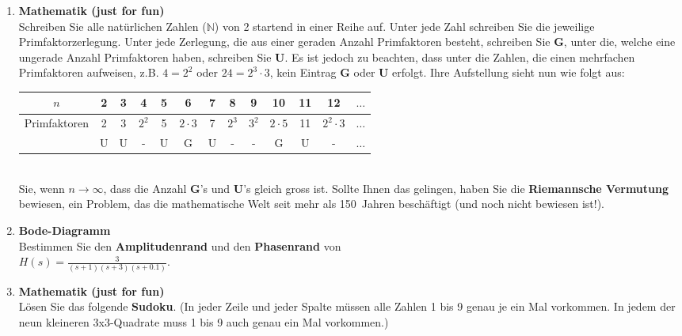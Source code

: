 {\begin{enumerate}
\item {\bf Mathematik (just for fun)}\\ Schreiben Sie alle nat\"urlichen Zahlen ($\mathbb{N}$) von 2 startend in einer Reihe auf. Unter jede Zahl schreiben Sie die jeweilige Primfaktorzerlegung. Unter jede Zerlegung, die aus einer geraden Anzahl Primfaktoren besteht, schreiben Sie {\bf G}, unter die, welche eine ungerade Anzahl Primfaktoren haben, schreiben Sie {\bf U}. Es ist jedoch zu beachten, dass unter die Zahlen, die einen mehrfachen Primfaktoren aufweisen, z.B. $4=2^2$ oder $24=2^3\cdot 3$, kein Eintrag {\bf G} oder {\bf U} erfolgt. Ihre Aufstellung sieht nun wie folgt aus:\\
\begin{table}[!htb]
\begin{center}
{\footnotesize
\begin{tabular}{|c||c|c|c|c|c|c|c|c|c|c|c|c|}\hline
 $n$             & 2 & 3 & 4     & 5 & 6          & 7 & 8     & 9     & 10         & 11 & 12         & $\ldots$ \\ \hline\hline
 Primfaktoren    & 2 & 3 & $2^2$ & 5 & $2\cdot 3$ & 7 & $2^3$ & $3^2$ & $2\cdot 5$ & 11 & $2^2\cdot 3$ & $\ldots$ \\ \hline
     & U & U & -     & U & G          & U & -     & -     & G          & U  & -          & $\ldots$ \\ \hline
\end{tabular}
}
\end{center}\vspace*{-2mm}
\end{table}\\
 Sie, wenn $n\rightarrow\infty$, dass die Anzahl
{\bf G}'s und {\bf U}'s gleich gross ist. Sollte Ihnen das gelingen,
haben Sie die {\bf Riemannsche Vermutung}
bewiesen, ein Problem, das die mathematische Welt seit mehr als
150~Jahren besch\"aftigt (und noch nicht bewiesen ist!).

\newpage
\item {\bf Bode-Diagramm}\\ Bestimmen Sie den  {\bf
  Amplitudenrand} und den {\bf
  Phasenrand} von \\ $H(s)=\frac{3}{(s+1)(s+3)(s+0.1)}$. %
 

\item {\bf Mathematik (just for fun)}\\ L\"osen Sie das folgende {\bf
    Sudoku}. (In jeder Zeile und jeder Spalte m\"ussen
  alle Zahlen 1 bis 9 genau je ein Mal vorkommen. In jedem der neun
  kleineren 3x3-Quadrate muss 1 bis 9 auch genau ein Mal vorkommen.)


\end{enumerate}}
